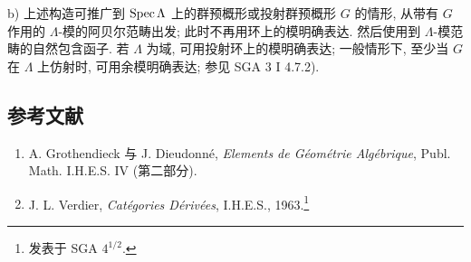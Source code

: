 b) 上述构造可推广到 $\operatorname{Spec}\Lambda$ 上的群预概形或投射群预概形 $G$ 的情形, 从带有 $G$ 作用的 $\Lambda$-模的阿贝尔范畴出发; 此时不再用环上的模明确表达. 然后使用到 $\Lambda$-模范畴的自然包含函子. 若 $\Lambda$ 为域, 可用投射环上的模明确表达; 一般情形下, 至少当 $G$ 在 $\Lambda$ 上仿射时, 可用余模明确表达; 参见 SGA 3 I 4.7.2).

\subsection*{参考文献}

\begin{enumerate}
\item[{[1]}] A. Grothendieck 与 J. Dieudonné, \emph{Elements de Géométrie Algébrique}, Publ. Math. I.H.E.S. IV (第二部分).
\item[{[2]}] J. L. Verdier, \emph{Catégories Dérivées}, I.H.E.S., 1963.\footnote{发表于 SGA $4^{1/2}$.}
\end{enumerate}
